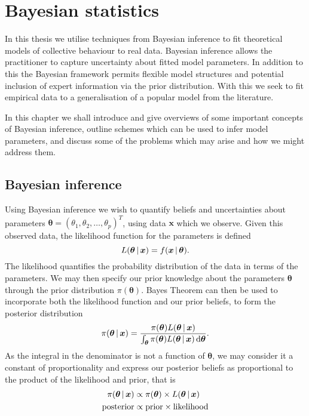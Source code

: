 \graphicspath{{fig/bayes_intro/}}

\chapter{Bayesian statistics}
\label{cha:bayes_intro}

In this thesis we utilise techniques from Bayesian inference to fit theoretical models of
collective behaviour to real data. Bayesian inference allows the practitioner to capture
uncertainty about fitted model parameters. In addition to this the Bayesian framework
permits flexible model structures and potential inclusion of expert information via the
prior distribution. With this we seek to fit empirical data to a generalisation of a
popular model from the literature.

In this chapter we shall introduce and give overviews of some important concepts of
Bayesian inference, outline schemes which can be used to infer model parameters, and
discuss some of the problems which may arise and how we might address them.

\section{Bayesian inference}
\label{sec:bayesian_inference}

Using Bayesian inference we wish to quantify beliefs and uncertainties about parameters
$\bm{\theta} = (\theta_1, \theta_2,\dots,\theta_p)^T$, using data $\bm{x}$ which we
observe. Given this observed data, the likelihood function for the parameters is defined
\[
    L(\bm{\theta}\,|\,\bm{x}) = f(\bm{x} \,|\, \bm{\theta}).
\]
The likelihood quantifies the probability distribution of the data in terms of the
parameters. We may then specify our prior knowledge about the parameters $\bm{\theta}$
through the prior distribution $\pi(\bm{\theta})$. Bayes Theorem can then be used to
incorporate both the likelihood function and our prior beliefs, to form the posterior
distribution
\begin{equation}
\label{eq:bayes_theorem}
    \pi(\bm{\theta}\,|\,\bm{x}) = 
        \frac{\pi({\bm{\theta}})L(\bm{\theta}\,|\,\bm{x})}{\int_{\bm{\theta}} 
        \pi(\bm{\theta})L(\bm{\theta}\,|\,\bm{x}) \, \textup{d}\bm{\theta}}.
\end{equation}
As the integral in the denominator is not a function of $\bm{\theta}$, we may consider it
a constant of proportionality and express our posterior beliefs as proportional to the
product of the likelihood and prior, that is
\begin{align*}
    \pi(\bm{\theta}\,|\,\bm{x}) &\propto \pi(\bm{\theta}) \times L(\bm{\theta}\,|\,\bm{x})\\
    \text{posterior} &\propto \text{prior} \times \text{likelihood}
\end{align*}

